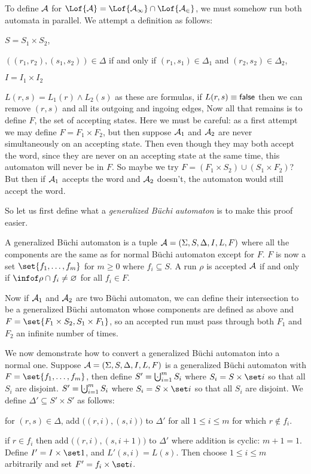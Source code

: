 To define ${\cal A}$ for $\Lof{\cal A}=\Lof{\cal A_1}\cap\Lof{\cal A_2}$, we must somehow run both automata in parallel.
We attempt a definition as follows:
\benum
    \item $S=S_1\times S_2$,
    \item $((r_1,r_2),(s_1,s_2))\in\Delta$ if and only if $(r_1,s_1)\in\Delta_1$ and $(r_2,s_2)\in\Delta_2$,
    \item $I=I_1\times I_2$
    \item $L(r,s)=L_1(r)\land L_2(s)$ as these are formulas, if $L(r,s)\equiv{\sf false}$ then we can remove $(r,s)$ and all its outgoing and ingoing edges,
\eenum
Now all that remains is to define $F$, the set of accepting states.
Here we must be careful: as a first attempt we may define $F=F_1\times F_2$, but then suppose ${\cal A}_1$ and ${\cal A}_2$ are never simultaneously on an accepting state.
Then even though they may both accept the word, since they are never on an accepting state at the same time, this automaton will never be in $F$.
So maybe we try $F=(F_1\times S_2)\cup(S_1\times F_2)$?
But then if ${\cal A}_1$ accepts the word and ${\cal A}_2$ doesn't, the automaton would still accept the word.

So let us first define what a {\it generalized B\"uchi automaton} is to make this proof easier.

\bdefn

    A {\emphcolor generalized B\"uchi automaton} is a tuple ${\cal A}=(\Sigma,S,\Delta,I,L,F)$ where all the components are the same as for normal B\"uchi automaton except for $F$.
    $F$ is now a set $\set{f_1,\dots,f_m}$ for $m\geq0$ where $f_i\subseteq S$.
    A run $\rho$ is accepted ${\cal A}$ if and only if $\infof\rho\cap f_i\neq\varnothing$ for all $f_i\in F$.

\edefn

Now if ${\cal A}_1$ and ${\cal A}_2$ are two B\"uchi automaton, we can define their intersection to be a generalized B\"uchi automaton whose components are defined as above and
$F=\set{F_1\times S_2,S_1\times F_1}$, so an accepted run must pass through both $F_1$ and $F_2$ an infinite number of times.

We now demonstrate how to convert a generalized B\"uchi automaton into a normal one.
Suppose ${\cal A}=(\Sigma,S,\Delta,I,L,F)$ is a generalized B\"uchi automaton with $F=\set{f_1,\dots,f_m}$, then define $S'=\bigdcup_{i=1}^mS_i$ where $S_i=S\times\set i$ so that all $S_i$ are disjoint.
$S'=\bigdcup_{i=1}^mS_i$ where $S_i=S\times\set i$ so that all $S_i$ are disjoint.
We define $\Delta'\subseteq S'\times S'$ as follows:
\benum
   \item for $(r,s)\in\Delta$, add $\bigl((r,i),(s,i)\bigr)$ to $\Delta'$ for all $1\leq i\leq m$ for which $r\notin f_i$.
   \item if $r\in f_i$ then add $\bigl((r,i),(s,i+1)\bigr)$ to $\Delta'$ where addition is cyclic: $m+1=1$.
\eenum
Define $I'=I\times\set1$, and $L'(s,i)=L(s)$.
Then choose $1\leq i\leq m$ arbitrarily and set $F'=f_i\times\set i$.

